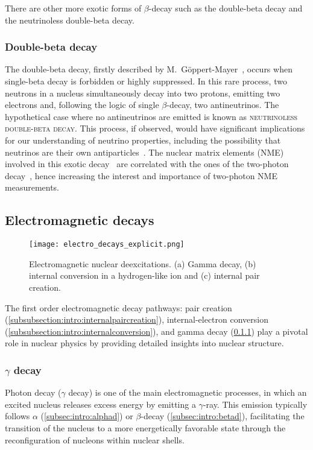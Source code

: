 There are other more exotic forms of $\beta$-decay such as the double-beta decay and the neutrinoless double-beta decay.
\subsubsection{Double-beta decay}\label{subsubsec:intro:doublebeta}
The double-beta decay, firstly described by M.~G\"{o}ppert-Mayer~\cite{Goeppert2beta}, occurs when single-beta decay is forbidden or highly suppressed. In this rare process, two neutrons in a nucleus simultaneously decay into two protons, emitting two electrons and, following the logic of single $\beta$-decay, two antineutrinos.
\newpar
The hypothetical case where no antineutrinos are emitted is known as \textsc{neutrinoless double-beta decay}. This process, if observed, would have significant implications for our understanding of neutrino properties, including the possibility that neutrinos are their own antiparticles~\cite{neutrinoless2beta}. The nuclear matrix elements (\textsc{NME}) involved in this exotic decay~\cite{Engel_2017} are correlated with the ones of the two-photon decay~\cite{ROMEO}, hence increasing the interest and importance of two-photon \textsc{NME} measurements.

\subsection{Electromagnetic decays}\label{subsec:intro:electromagnetic_decays}

\begin{figure}[hbt]
    \texttt{[image: electro\_decays\_explicit.png]}
    \caption{Electromagnetic nuclear deexcitations. (a) Gamma decay, (b) internal conversion in a hydrogen-like ion and (c) internal pair creation.}
\end{figure}

The first order electromagnetic decay pathways: pair creation (\cref{subsubsection:intro:internalpaircreation}), internal-electron conversion (\cref{subsubsection:intro:internalconversion}), and gamma decay (\cref{subsubsection:intro:gammadecay}) play a pivotal role in nuclear physics by providing detailed insights into nuclear structure. 

\subsubsection{$\gamma$ decay}\label{subsubsection:intro:gammadecay}

Photon decay ($\gamma$ decay) is one of the main electromagnetic processes, in which an excited nucleus releases excess energy by emitting a $\gamma$-ray. This emission typically follows $\alpha$ (\cref{subsec:intro:alphad}) or $\beta$-decay (\cref{subsec:intro:betad}), facilitating the transition of the nucleus to a more energetically favorable state through the reconfiguration of nucleons within nuclear shells.

